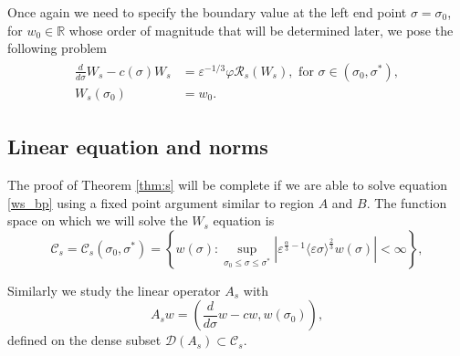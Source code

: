 \documentclass[letterpaper,11pt]{article}
\newcommand{\Ral}{\mathcal{R}}
\newcommand{\eps}{\varepsilon}
\numberwithin{equation}{section}
\theoremstyle{plain}
\begin{document}
Once again we need to specify the boundary value at the left end point $\sigma = \sigma_0$, for $w_0 \in \mathbb{R}$ whose order of magnitude that will be determined later, we pose the following problem
\begin{align}\label{ws_bp}
\begin{split}
\frac{d}{d\sigma} W_s - c(\sigma)W_s &= \eps^{-1/3}\varphi \Ral_s(W_s), \text{ for }\sigma \in (\sigma_0,\sigma^*),\\
W_s(\sigma_0) &= w_0.
\end{split}
\end{align}





\subsection{Linear equation and norms}
The proof of Theorem \ref{thm:s} will be complete if we are able to solve equation \eqref{ws_bp} using a fixed point argument similar to region $A$ and $B$. The function space on which we will solve the $W_s$ equation is
\[
\mathcal{C}_s= \mathcal{C}_s(\sigma_0, \sigma^*)  = \left\{ w(\sigma) : \sup_{\sigma_0 \le \sigma \le \sigma^*} |\eps^{\frac{\alpha}{3} -1 }\langle \eps\sigma \rangle^{\frac{2}{3}} w(\sigma)|<\infty \right\},
\]

Similarly we study the linear operator $A_s$ with \[
A_s w = \left(\frac{d}{d\sigma}w - cw, w(\sigma_0)\right),
\]
defined on the dense subset $\mathcal{D}(A_s) \subset \mathcal{C}_s$.
\end{document}
